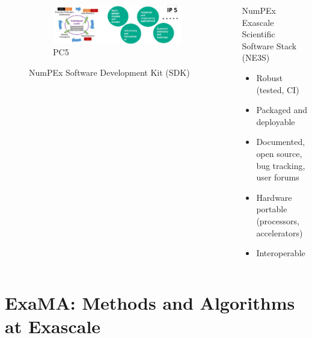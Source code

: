 \begin{frame}
\begin{columns}[t]
\begin{column}{.5\textwidth}
\begin{figure}[ht]
\begin{subfigure}{.9\textwidth}
            \includegraphics[width=\textwidth]{../figures/numpex-ip5-1.png}
            \caption{PC5}
          \end{subfigure}
         \caption{NumPEx Software Development Kit (SDK)}%
         \label{some-label}%
        \end{figure}
    \end{column}
    \begin{column}{0.5\textwidth}
       \begin{alertblock}{NumPEx Exascale Scientific Software Stack (NE3S)}
         \begin{itemize}
           \item Robust (tested, CI)
           \item Packaged and deployable
           \item Documented, open source, bug          tracking, user forums
           \item Hardware portable (processors,  accelerators)
           \item Interoperable
         \end{itemize}
       \end{alertblock}
    \end{column}
    
    \end{columns}


\end{frame}

\section{ExaMA: Methods and Algorithms at Exascale}
